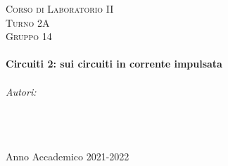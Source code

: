 \documentclass[a4paper]{article}
\begin{document}
\begin{titlepage}
\center
    
\textsc{\LARGE Corso di Laboratorio II}\\[1.5cm] %
\textsc{\large Turno 2A}\\[0.5cm] %
\textsc{\large Gruppo 14}\\[0.5cm]

\HRule \\[0.6cm]
{ \huge \bfseries Circuiti 2: sui circuiti in corrente impulsata}\\[0.4cm] %
\HRule \\[1.5cm]
    

\Large \emph{Autori:} \\
\textsc{} \\
\textsc{} \\
\textsc{} \\ [4cm]

\vspace{8cm}

{\large Anno Accademico 2021-2022}\\[2cm] %


\vfill
\end{titlepage}




\tableofcontents
\clearpage

\listoffigures
{}
\clearpage

\setcounter{page}{1}
\end{document}
